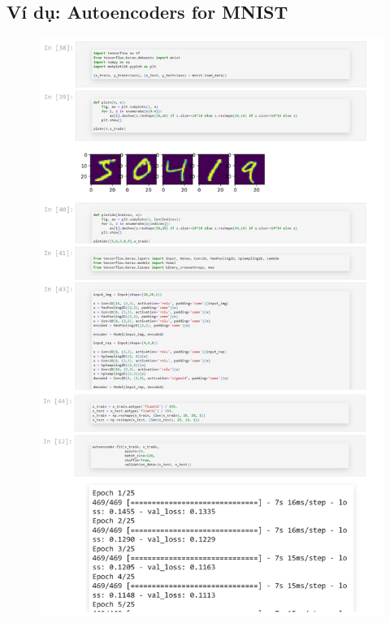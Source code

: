 \documentclass{book}
\begin{document}
\subsection{Ví dụ: Autoencoders for MNIST}
\begin{figure}[H]
	\centering
	\includegraphics[width=0.75\linewidth]{images/au2_egmnist.png}
\end{figure}
\end{document}
